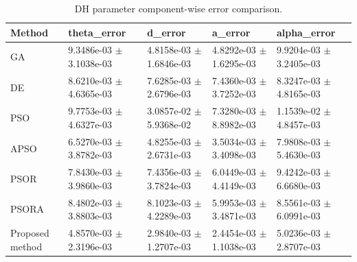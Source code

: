 \begin{table}
\caption{DH parameter component-wise error comparison.}
\label{tab:dh_component_errors}
\begin{tabular}{lllll}
\toprule
Method & theta_error & d_error & a_error & alpha_error \\
\midrule
GA & 9.3486e-03 $\pm$ 3.1038e-03 & 4.8158e-03 $\pm$ 1.6846e-03 & 4.8292e-03 $\pm$ 1.6295e-03 & 9.9204e-03 $\pm$ 3.2405e-03 \\
DE & 8.6210e-03 $\pm$ 4.6365e-03 & 7.6285e-03 $\pm$ 2.6796e-03 & 7.4360e-03 $\pm$ 3.7252e-03 & 8.3247e-03 $\pm$ 4.8165e-03 \\
PSO & 9.7753e-03 $\pm$ 4.6327e-03 & 3.0857e-02 $\pm$ 5.9368e-02 & 7.3280e-03 $\pm$ 8.8982e-03 & 1.1539e-02 $\pm$ 4.8457e-03 \\
APSO & 6.5270e-03 $\pm$ 3.8782e-03 & 4.8255e-03 $\pm$ 2.6731e-03 & 3.5034e-03 $\pm$ 3.4098e-03 & 7.9808e-03 $\pm$ 5.4630e-03 \\
PSOR & 7.8430e-03 $\pm$ 3.9860e-03 & 7.4356e-03 $\pm$ 3.7824e-03 & 6.0449e-03 $\pm$ 4.4149e-03 & 9.4242e-03 $\pm$ 6.6680e-03 \\
PSORA & 8.4802e-03 $\pm$ 3.8803e-03 & 8.1023e-03 $\pm$ 4.2289e-03 & 5.9953e-03 $\pm$ 3.4871e-03 & 8.5561e-03 $\pm$ 6.0991e-03 \\
Proposed method & 4.8570e-03 $\pm$ 2.3196e-03 & 2.9840e-03 $\pm$ 1.2707e-03 & 2.4454e-03 $\pm$ 1.1038e-03 & 5.0236e-03 $\pm$ 2.8707e-03 \\
\bottomrule
\end{tabular}
\end{table}
